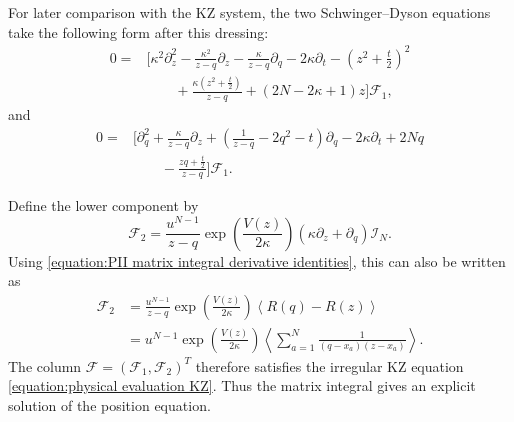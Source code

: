 \documentclass[a4paper,11pt]{article}
\newcommand{\cF}{\mathcal{F}}
\numberwithin{equation}{section}
\begin{document}
For later comparison with the KZ system, the two Schwinger--Dyson equations
take the following form after this dressing:
\begin{equation}
\begin{aligned}
		0={}&
		\Bigg[
		\kappa^{2}\partial_{z}^{2}
		-\frac{\kappa^{2}}{z-q}\partial_{z}
		-\frac{\kappa}{z-q}\partial_{q}
		-2\kappa\partial_{t}
		-\left(
		z^{2}+\frac{t}{2}
		\right)^{2}
		\\
		&\qquad
		+\frac{\kappa\left(z^{2}+\frac{t}{2}\right)}{z-q}
		+(2N-2\kappa+1)z
		\Bigg]\cF_{1},
	\end{aligned}
\end{equation}
and
\begin{equation}
\begin{aligned}
		0={}&
		\Bigg[
		\partial_{q}^{2}
		+\frac{\kappa}{z-q}\partial_{z}
		+\left(
		\frac{1}{z-q}-2q^{2}-t
		\right)\partial_{q}
		-2\kappa\partial_{t}
		+2Nq
		\\
		&\qquad
		-\frac{zq+\frac{t}{2}}{z-q}
		\Bigg]\cF_{1}.
	\end{aligned}
\end{equation}

Define the lower component by
\begin{equation}
\cF_{2}
	=
	\frac{u^{N-1}}{z-q}
	\exp\left(\frac{V(z)}{2\kappa}\right)
	\left(
	\kappa\partial_{z}+\partial_{q}
	\right)
	\mathcal{I}_{N}.
\end{equation}
Using \eqref{equation:PII matrix integral derivative identities}, this can also be written as
\begin{equation}
	\label{equation:PII matrix integral lower component resolvent}
	\begin{aligned}
		\cF_{2}
		&=
		\frac{u^{N-1}}{z-q}
		\exp\left(\frac{V(z)}{2\kappa}\right)
		\left\langle
		R(q)-R(z)
		\right\rangle
		\\
		&=
		u^{N-1}
		\exp\left(\frac{V(z)}{2\kappa}\right)
		\left\langle
		\sum_{a=1}^{N}
		\frac{1}{(q-x_{a})(z-x_{a})}
		\right\rangle.
	\end{aligned}
\end{equation}
The column $\cF=(\cF_{1},\cF_{2})^{T}$ therefore satisfies
the irregular KZ equation \eqref{equation:physical evaluation KZ}.
Thus the matrix integral gives an explicit solution of the position equation.
\end{document}
